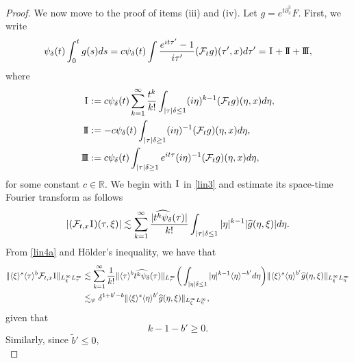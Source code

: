 \documentclass[%
11pt,  reqno]{amsart}
\newcommand{\jap}[1]{\langle #1 \rangle}
\newcommand{\I}{\hspace{0.2mm}\textup{I}\hspace{0.2mm}}
\newcommand{\II}{\textup{I \hspace{-2.9mm} I} }
\newcommand{\III}{\textup{I \hspace{-2.9mm} I \hspace{-2.9mm} I}}
\newcommand{\5}{\textup{V}}
\newcommand{\noi}{\noindent}
\newcommand{\ft}{\widehat}
\newcommand{\les}{\lesssim}
\newcommand{\dl}{\delta}
\newcommand{\F}{\mathcal{F}}
\theoremstyle{remark}
\newcommand{\R}{\mathbb{R}}
\numberwithin{equation}{section}
\numberwithin{theorem}{section}
\begin{document}
{\begin{proof}
			\smallskip
			\noi
			We now move to the proof of items (iii) and (iv).
			Let $g=e^{t\partial_x^3} F$. First, we write
			\begin{equation}
				\psi_\delta(t)\int_0^t g(s) ds = c\psi_\delta(t)\int \frac{e^{it\tau'}-1}{i\tau'} (\mathcal{F}_tg)(\tau',x) d\tau' = \I + \II + \III,
				\label{lin3a}
			\end{equation}
			where
			\begin{equation}
				\label{lin3}
				\begin{aligned}
					\I & :=c\psi_\delta(t)\sum_{k= 1}^\infty \frac{t^k}{k!}\int_{|\tau|\delta \le 1} (i\eta)^{k-1} (\mathcal{F}_tg)(\eta,x) d\eta, \\
					\II& :=-c\psi_\delta(t)\int_{|\tau|\delta \ge 1} (i\eta)^{-1} (\mathcal{F}_tg)(\eta,x) d\eta , \\
					\III & :=c\psi_\delta(t)\int_{|\tau|\delta \ge 1} e^{it\tau}(i\eta)^{-1} (\mathcal{F}_tg)(\eta,x) d\eta,
				\end{aligned}
			\end{equation}
			for some constant $c\in\R$.
			We begin with $\I$ in \eqref{lin3} and estimate its space-time Fourier transform as follows
			\begin{equation}
				|(\mathcal{F}_{t,x}\I)(\tau, \xi)| \les \sum_{k= 1}^\infty \frac{|\widehat{t^k\psi_\delta}(\tau)|}{k!} \int_{|\tau|\delta \le 1} |\eta|^{k-1} |\ft{g}(\eta,\xi)| d\eta.
				\label{lin4a}
			\end{equation}
			From \eqref{lin4a} and H\"older's inequality, we have that
			\begin{equation}
				\begin{aligned}
					\| \jap{\xi}^s \jap{\tau}^b \F_{t,x} \I \|_{L^\infty_\xi L^\infty_\tau} & \les \sum_{k=1}^\infty \frac{1}{k!} \| \jap{\tau}^b\ft{t^k \psi_\dl} (\tau) \|_{L^\infty_\tau} \bigg( \int_{|\eta|\dl \le 1} |\eta|^{k-1} \jap{\eta}^{-b'} d\eta \bigg) \| \jap{\xi}^s \jap{\eta}^{b'} \ft{g}(\eta, \xi) \|_{L^\infty_\xi L^\infty_\eta} \\
					& \les_\psi \dl^{1+ b' -b} \| \jap{\xi}^s \jap{\eta}^{b'} \ft{g}(\eta, \xi) \|_{L^\infty_\xi L^\infty_\eta},
				\end{aligned}
				\label{lin4b}
			\end{equation}
			\noi
			given that
			\begin{equation}
				k-1-b' \ge 0 .
				\label{lin4bb}
			\end{equation}
			Similarly, since $\tilde{b}'\le 0$,
			\begin{equation}

\end{equation}
\end{proof}}
\end{document}
